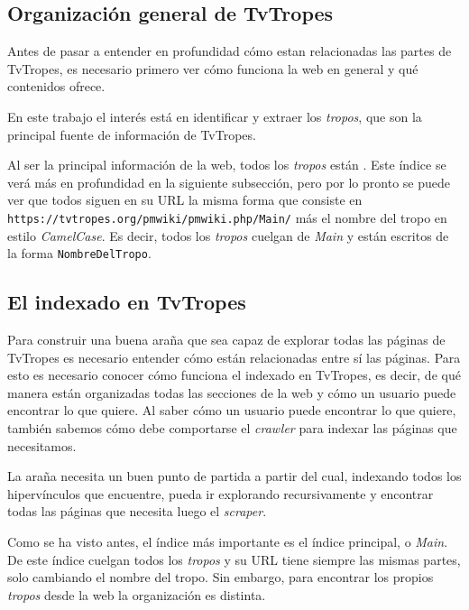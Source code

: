 \subsection{Organización general de TvTropes}
Antes de pasar a entender en profundidad cómo estan relacionadas las partes de
TvTropes, es necesario primero ver cómo funciona la web en general y qué
contenidos ofrece.

En este trabajo el interés está en identificar y extraer los \textit{tropos},
que son la principal fuente de información de TvTropes.

Al ser la principal información de la web, todos los \textit{tropos} están .
Este índice se verá más en profundidad en la siguiente subsección, pero por lo
pronto se puede ver que todos siguen en su URL la misma forma que consiste en
\texttt{https://tvtropes.org/pmwiki/pmwiki.php/Main/} más el nombre del tropo en
estilo \textit{CamelCase}. Es decir, todos los \textit{tropos} cuelgan de
\textit{Main} y están escritos de la forma \texttt{NombreDelTropo}.

\subsection{El indexado en TvTropes}
Para construir una buena araña que sea capaz de explorar todas las páginas de
TvTropes es necesario entender cómo están relacionadas entre sí las páginas.
Para esto es necesario conocer cómo funciona el indexado en TvTropes, es decir,
de qué manera están organizadas todas las secciones de la web y cómo un usuario
puede encontrar lo que quiere. Al saber cómo un usuario puede encontrar lo que
quiere, también sabemos cómo debe comportarse el \textit{crawler} para indexar
las páginas que necesitamos.

La araña necesita un buen punto de partida a partir del cual, indexando todos
los hipervínculos que encuentre, pueda ir explorando recursivamente y encontrar
todas las páginas que necesita luego el \textit{scraper}.

Como se ha visto antes, el índice más importante es el índice principal, o
\textit{Main}. De este índice cuelgan todos los \textit{tropos} y su URL tiene
siempre las mismas partes, solo cambiando el nombre del tropo. Sin embargo, para
encontrar los propios \textit{tropos} desde la web la organización es distinta.

